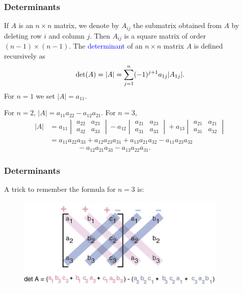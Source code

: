 \documentclass[11pt,aspectratio=169]{beamer}
\begin{document}
\begin{frame}
\frametitle{Determinants}
\begin{small}
If $A$ is an $n \times n$ matrix, we denote by $A_{ij}$ the submatrix obtained from $A$ by deleting row $i$ and column $j$. Then $A_{ij}$ is a square matrix of order $(n-1) \times (n-1)$.
\vskip 12pt
 The \textcolor{blue}{determinant} of an $n \times n$ matrix $A$ is defined recursively as
\begin{equation*}
\textnormal{det}(A)=\vert A \vert=\sum_{j=1}^n (-1)^{j+1} a_{1j} \vert A_{1j} \vert.
\end{equation*}
For $n=1$ we set $\vert A \vert=a_{11}$.

\vskip 12pt
 For  $n=2$, $\vert A \vert=a_{11}a_{22}-a_{12} a_{21}$.
\vskip 12pt
For $n=3$,
\begin{equation*} \begin{split}
\vert A \vert&=a_{11} \begin{vmatrix}
a_{22}& a_{23}\\
a_{32}& a_{33}
\end{vmatrix}-a_{12}\begin{vmatrix}
a_{21}& a_{23}\\
a_{31}& a_{33}
\end{vmatrix} +a_{13} \begin{vmatrix}
a_{21}& a_{21}\\
a_{31}& a_{32}
\end{vmatrix}\\
&=a_{11} a_{22} a_{33}+a_{12}a_{23} a_{31}+a_{13} a_{21} a_{32}-a_{11} a_{23}a_{32}\\
&\qquad \qquad -a_{12} a_{21} a_{33}-a_{13}a_{22} a_{31}.
\end{split}
\end{equation*}


\end{small}
\end{frame}

\begin{frame}
\frametitle{Determinants}
\begin{small}A trick to remember the formula for $n=3$ is:\end{small}
\begin{figure}
\includegraphics[width=4in]{img/deter} 
\end{figure}
\end{frame}
\end{document}
